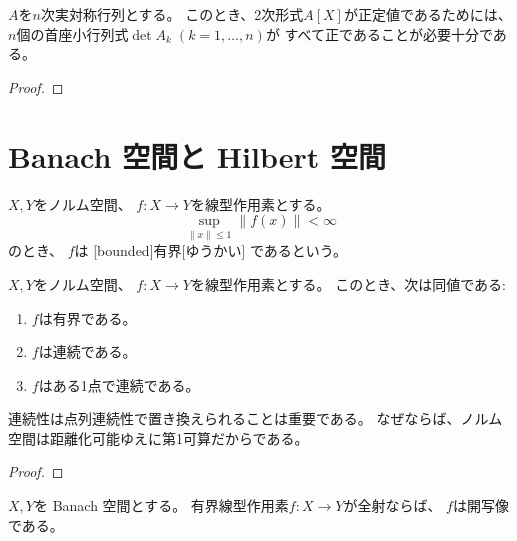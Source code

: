 \documentclass[report]{jlreq}
\begin{document}

\begin{proposition}[正定値性の判定]
    $A$を$n$次実対称行列とする。
    このとき、2次形式$A[X]$が正定値であるためには、
    $n$個の首座小行列式$\det A_k \; (k = 1, \dots, n)$が
    すべて正であることが必要十分である。
\end{proposition}

\begin{proof}
    \TODO{}
\end{proof}

%
\section{Banach 空間と Hilbert 空間}

\begin{definition}[有界線型作用素]
    $X, Y$をノルム空間、
    $f \colon X \to Y$を線型作用素とする。
    \begin{equation}
        \sup_{\| x \| \le 1} \| f(x) \| < \infty
    \end{equation}
    のとき、
    $f$は
    [bounded]{有界}[ゆうかい]
    であるという。
\end{definition}

\begin{theorem}[有界性の特徴づけ]
    $X, Y$をノルム空間、
    $f \colon X \to Y$を線型作用素とする。
    このとき、次は同値である:
    \begin{enumerate}
        \item $f$は有界である。
        \item $f$は連続である。
        \item $f$はある1点で連続である。
    \end{enumerate}
\end{theorem}

連続性は点列連続性で置き換えられることは重要である。
なぜならば、ノルム空間は距離化可能ゆえに第1可算だからである。

\begin{proof}
    \TODO{}
\end{proof}

\begin{theorem}[開写像定理]
    $X, Y$を Banach 空間とする。
    有界線型作用素$f \colon X \to Y$が全射ならば、
    $f$は開写像である。
\end{theorem}
\end{document}
